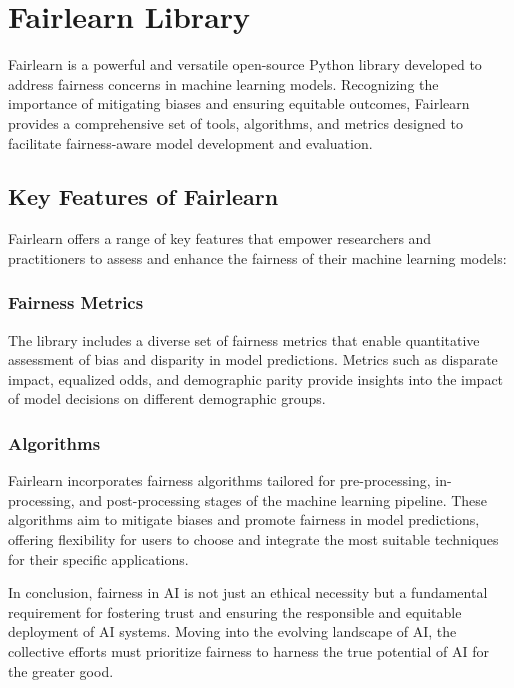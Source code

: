 \documentclass[12pt,a4paper,openright,twoside]{book}
\begin{document}
\newpage
\section{Fairlearn Library}
\label{section:fairlearn}

Fairlearn is a powerful and versatile open-source Python library developed to address fairness concerns in machine learning models. Recognizing the importance of mitigating biases and ensuring equitable outcomes, Fairlearn provides a comprehensive set of tools, algorithms, and metrics designed to facilitate fairness-aware model development and evaluation.

\subsection{Key Features of Fairlearn}

Fairlearn offers a range of key features that empower researchers and practitioners to assess and enhance the fairness of their machine learning models:

\subsubsection{Fairness Metrics}

The library includes a diverse set of fairness metrics that enable quantitative assessment of bias and disparity in model predictions. Metrics such as disparate impact, equalized odds, and demographic parity provide insights into the impact of model decisions on different demographic groups.

\subsubsection{Algorithms}

Fairlearn incorporates fairness algorithms tailored for pre-processing, in-processing, and post-processing stages of the machine learning pipeline. These algorithms aim to mitigate biases and promote fairness in model predictions, offering flexibility for users to choose and integrate the most suitable techniques for their specific applications.

In conclusion, fairness in AI is not just an ethical necessity but a fundamental requirement for fostering trust and ensuring the responsible and equitable deployment of AI systems. Moving into the evolving landscape of AI, the collective efforts must prioritize fairness to harness the true potential of AI for the greater good.
\end{document}
